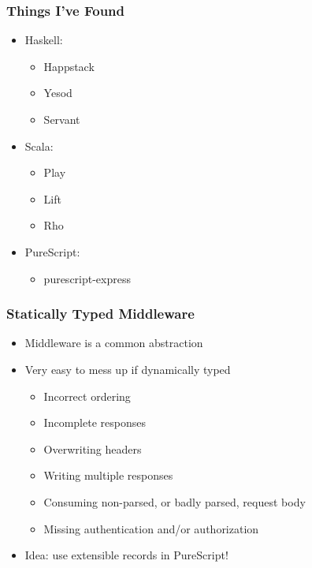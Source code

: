 \begin{frame}
  \frametitle{Things I've Found}
  \begin{itemize}
    \pause
    \item<+-> Haskell:
      \begin{itemize}
        \item<+-> Happstack
        \item<+-> Yesod
        \item<+-> Servant
      \end{itemize}
    \item<+-> Scala:
      \begin{itemize}
        \item<+-> Play
        \item<+-> Lift
        \item<+-> Rho
      \end{itemize}
    \item<+-> PureScript:
      \begin{itemize}
        \item<+-> purescript-express
      \end{itemize}
  \end{itemize}
\end{frame}

\begin{frame}
  \frametitle{Statically Typed Middleware}
  \begin{itemize}
    \pause
    \item<+-> Middleware is a common abstraction
    \item<+-> Very easy to mess up if dynamically typed
      \begin{itemize}
        \item<+-> Incorrect ordering
        \item<+-> Incomplete responses
        \item<+-> Overwriting headers
        \item<+-> Writing multiple responses
        \item<+-> Consuming non-parsed, or badly parsed, request body
        \item<+-> Missing authentication and/or authorization
      \end{itemize}
    \item<+-> Idea: use extensible records in PureScript!
  \end{itemize}
\end{frame}


